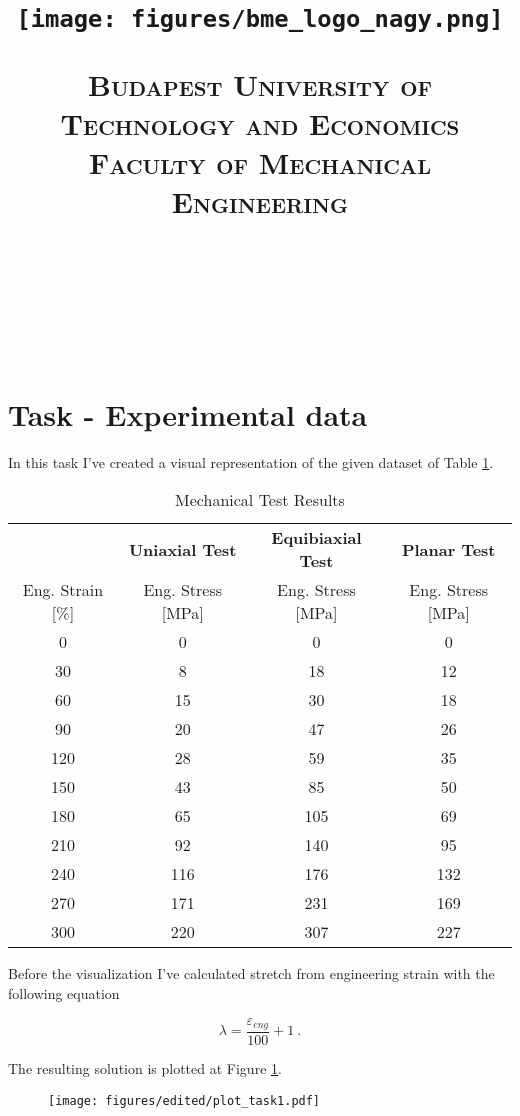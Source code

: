 \documentclass[12pt]{article}
\title{\centering \texttt{[image: figures/bme\_logo\_nagy.png]}
\bigskip

\normalfont \normalsize \textsc{\centering Budapest University of Technology and Economics
\\ Faculty of Mechanical Engineering} \\ [12pt] \horrule{0.5pt} \\[0.4cm] \huge \HFCIME{} \\ \horrule{2pt} \\[0.5cm]}
\author{\NEV{}}
\begin{document}

\pagebreak
\maketitle

\pagebreak
\tableofcontents
\newpage
\section{Task - Experimental data}
In this task I've created a visual representation of the given dataset of Table \ref{tab:mechanical_tests}.

\begin{table}[htbp]
    \centering
    \caption{Mechanical Test Results}
    \label{tab:mechanical_tests}
    \begin{tabular}{cccc}
        & \textbf{Uniaxial Test} & \textbf{Equibiaxial Test} & \textbf{Planar Test} \\[0.2 cm]
        Eng. Strain [\%] & Eng. Stress [MPa] & Eng. Stress [MPa] & Eng. Stress [MPa] \\ [0.1 cm] \hline
        0 & 0 & 0 & 0 \\
        30 & 8 & 18 & 12 \\
        60 & 15 & 30 & 18 \\
        90 & 20 & 47 & 26 \\
        120 & 28 & 59 & 35 \\
        150 & 43 & 85 & 50 \\
        180 & 65 & 105 & 69 \\
        210 & 92 & 140 & 95 \\
        240 & 116 & 176 & 132 \\
        270 & 171 & 231 & 169 \\
        300 & 220 & 307 & 227
    \end{tabular}
\end{table}

\noindent Before the visualization I've calculated stretch from engineering strain with the following equation

\begin{equation}
  \lambda = \dfrac{\varepsilon_{eng}}{100} + 1 ~.
\end{equation}

\noindent The resulting solution is plotted at Figure \ref{fig:plot1}.

\begin{figure}[ht!]
  \begin{center}
  \texttt{[image: figures/edited/plot\_task1.pdf]}
  \label{fig:plot1}
  \end{center}
\end{figure}
\end{document}
